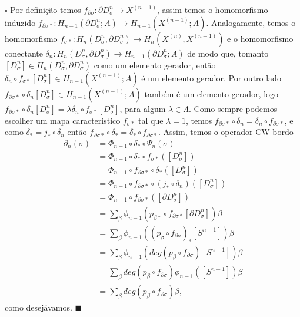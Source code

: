 \documentclass[12pt]{book}
\newenvironment{prova}[1]{$\square$ #1}{\hfill$\blacksquare$}
\newcommand{\celula}[2]{D^{#1}_{#2}}
\newcommand{\celulabordo}[2]{\partial D^{#1}_{#2}}
\newcommand{\homologia}[2]{H_{#1}(#2;A)}
\newcommand{\homologiarelcel}[3]{H_{#1}(D^{#2}_{#3}, \partial D^{#2}_{#3})}
\newcommand{\homologiarelskelesimpl}[2]{H_{#1}(X^{(#2)}, X^{(#2-1)})}
\newcommand{\skeleton}[1]{X^{(#1)}}
\begin{document}
\begin{prova}
		Por definição temos $f_{\partial\sigma}: \celulabordo{n}{\sigma} \to \skeleton{n-1}$, assim temos o homomorfismo induzido $f_{\partial\sigma*}: \homologia{n-1}{\celulabordo{n}{\sigma} }\to \homologia{n-1}{\skeleton{n-1}}$. Analogamente, temos o homomorfismo $f_{\sigma*}:\homologiarelcel{n}{n}{\sigma} \to \homologiarelskelesimpl{n}{n}$ e o homomorfismo conectante $\delta_{n} : \homologiarelcel{n}{n}{\sigma} \to \homologia{n-1}{\celulabordo{n}{\sigma}}$ de modo que, tomanto $[\celula{n}{\sigma}] \in \homologiarelcel{n}{n}{\sigma}$ como um elemento gerador, então $\delta_{n}\circ f_{\sigma*}[\celula{n}{\sigma}] \in \homologia{n-1}{\skeleton{n-1}}$ é um elemento gerador. Por outro lado $f_{\partial\sigma*}\circ \delta_{n}[\celula{n}{\sigma}] \in \homologia{n-1}{\skeleton{n-1}}$ também é um elemento gerador, logo $f_{\partial\sigma*}\circ \delta_{n}[\celula{n}{\sigma}] = \lambda \delta_{n}\circ f_{\sigma*}[\celula{n}{\sigma}]$, para algum $\lambda \in \Lambda$. Como sempre podemos escolher um mapa caracteristico $f_{\sigma *}$ tal que $\lambda = 1$, temos $f_{\partial\sigma*}\circ \delta_{n} = \delta_{n}\circ f_{\partial\sigma*}$, e como $\delta_{*} = j_{*}\circ\delta_{n}$ então $f_{\partial\sigma*}\circ \delta_{*} = \delta_{*}\circ f_{\partial\sigma*}$. Assim, temos o operador CW-bordo
		$$
		\begin{aligned}
		\partial_{n}(\sigma) &= \Phi_{n-1}\circ\delta_{*}\circ\Psi_{n}(\sigma)
		\\
		&= \Phi_{n-1}\circ\delta_{*}\circ f_{\sigma*}([\celula{n}{\sigma}])
		\\
		&= \Phi_{n-1}\circ f_{\partial\sigma*}\circ\delta_{*}([\celula{n}{\sigma}])
		\\
		&= \Phi_{n-1}\circ f_{\partial\sigma*}\circ (j_{*}\circ \delta_{n}) ([\celula{n}{\sigma}])
		\\
		&= \Phi_{n-1} \circ f_{\partial\sigma*}([\celulabordo{n}{\sigma}])
		\\
		&= \sum_{\beta} \phi_{n-1}(p_{\beta*}\circ f_{\partial\sigma*}[\celulabordo{n}{\sigma}])\beta
		\\
		&= \sum_{\beta} \phi_{n-1}((p_{\beta}\circ f_{\partial\sigma})_{*}[S^{n-1}])\beta
		\\
		&= \sum_{\beta} \phi_{n-1}(deg(p_{\beta}\circ f_{\partial\sigma})[S^{n-1}])\beta
		\\
		&= \sum_{\beta} deg(p_{\beta}\circ f_{\partial\sigma})\phi_{n-1}([S^{n-1}])\beta
		\\
		&= \sum_{\beta} deg(p_{\beta}\circ f_{\partial\sigma})\beta,
		\end{aligned}
		$$
		como desejávamos.
	\end{prova}
	
\end{document}
